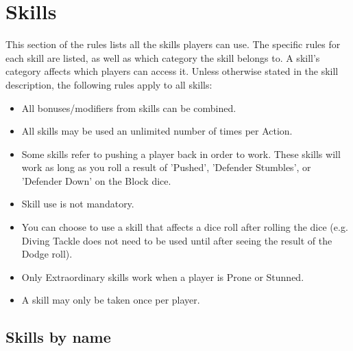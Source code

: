 \section{Skills}
\par This section of the rules lists all the skills players can use. The specific rules for each skill are listed, as well as which category the skill belongs to. A skill's category affects which players can access it. Unless otherwise stated in the skill description, the following rules apply to all skills:

\begin{itemize}
\item All bonuses/modifiers from skills can be combined.
\item All skills may be used an unlimited number of times per Action.
\item Some skills refer to pushing a player back in order to work. These skills will work as long as you roll a result of 'Pushed', 'Defender Stumbles', or 'Defender Down' on the Block dice.
\item Skill use is not mandatory.
\item You can choose to use a skill that affects a dice roll after rolling the dice (e.g. Diving Tackle does not need to be used until after seeing the result of the Dodge roll).
\item Only Extraordinary skills work when a player is Prone or Stunned.
\item A skill may only be taken once per player.
\end{itemize}

\subsection{Skills by name}

